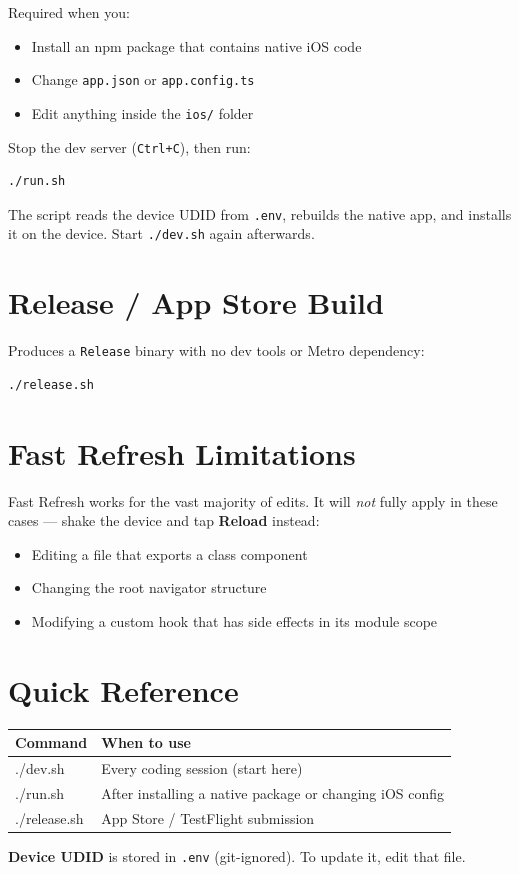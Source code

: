 \documentclass[12pt]{article}
\begin{document}
Required when you:
\begin{itemize}
  \item Install an npm package that contains native iOS code
  \item Change \texttt{app.json} or \texttt{app.config.ts}
  \item Edit anything inside the \texttt{ios/} folder
\end{itemize}

Stop the dev server (\texttt{Ctrl+C}), then run:
\begin{lstlisting}
./run.sh
\end{lstlisting}
The script reads the device UDID from \texttt{.env}, rebuilds the native app,
and installs it on the device. Start \texttt{./dev.sh} again afterwards.

\section{Release / App Store Build}

Produces a \texttt{Release} binary with no dev tools or Metro dependency:
\begin{lstlisting}
./release.sh
\end{lstlisting}

\section{Fast Refresh Limitations}

Fast Refresh works for the vast majority of edits. It will \emph{not} fully
apply in these cases --- shake the device and tap \textbf{Reload} instead:

\begin{itemize}
  \item Editing a file that exports a class component
  \item Changing the root navigator structure
  \item Modifying a custom hook that has side effects in its module scope
\end{itemize}

\section{Quick Reference}

\begin{center}
\begin{tabular}{>{\ttfamily}ll}
\toprule
\normalfont\textbf{Command} & \textbf{When to use} \\
\midrule
./dev.sh         & Every coding session (start here) \\
./run.sh         & After installing a native package or changing iOS config \\
./release.sh     & App Store / TestFlight submission \\
\bottomrule
\end{tabular}
\end{center}

\medskip
\noindent\textbf{Device UDID} is stored in \texttt{.env} (git-ignored).
To update it, edit that file.
\end{document}

